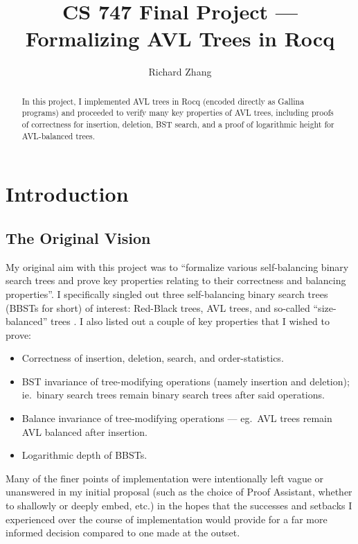 \documentclass[acmsmall, authorversion, nonacm, overload]{acmart}
\begin{document}
\title{CS 747 Final Project --- Formalizing AVL Trees in Rocq}
\author{Richard Zhang}

\begin{abstract}
  In this project, I implemented AVL trees in Rocq (encoded directly as Gallina programs)
  and proceeded to verify many key properties of AVL trees, including
  proofs of correctness for insertion, deletion, BST search,
  and a proof of logarithmic height for AVL-balanced trees.
\end{abstract}

\maketitle

\section{Introduction}
\subsection{The Original Vision}
My original aim with this project was to ``formalize various self-balancing binary search trees
and prove key properties relating to their correctness and balancing properties''.
I specifically singled out three self-balancing binary search trees (BBSTs for short) of interest:
Red-Black trees, AVL trees, and so-called ``size-balanced'' trees \cite{SBT}.
I also listed out a couple of key properties that I wished to prove:
\begin{itemize}
\item Correctness of insertion, deletion, search, and order-statistics.
\item BST invariance of tree-modifying operations (namely insertion and deletion); ie.\
  binary search trees remain binary search trees after said operations.
\item Balance invariance of tree-modifying operations --- eg.\ AVL trees remain AVL balanced after insertion.
\item Logarithmic depth of BBSTs.
\end{itemize}
Many of the finer points of implementation were intentionally left vague or unanswered in my initial proposal
(such as the choice of Proof Assistant, whether to shallowly or deeply embed, etc.) in the hopes that
the successes and setbacks I experienced over the course of implementation would provide for
a far more informed decision compared to one made at the outset.
\end{document}
